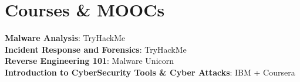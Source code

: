 \documentclass[letterpaper,11pt]{article}
\begin{document}
\section{Courses \& MOOCs}
\begin{itemize}[leftmargin=0.15in, label={}]
    \normalsize{\item{
     \textbf{Malware Analysis}{: TryHackMe} \\
     \textbf{Incident Response and Forensics}{: TryHackMe}\\
     \textbf{Reverse Engineering 101}{: Malware Unicorn} \\
     \textbf{Introduction to CyberSecurity Tools \& Cyber Attacks}{: IBM + Coursera} \\
    }}
 \end{itemize}
\end{document}
